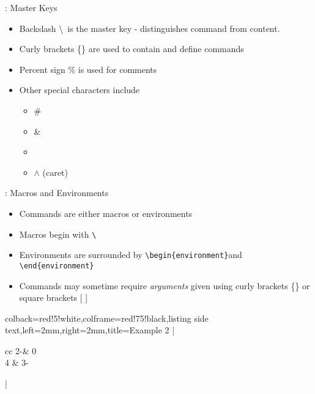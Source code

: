 \documentclass{beamer}
\begin{document}
\begin{frame}[fragile]{\insertsection : Master Keys}
    \begin{itemize}
        \item Backslash \textbackslash \, is the master key - distinguishes command from content.
        \item Curly brackets \{\} are used to contain and define commands
        \item Percent sign \% is used for comments
        \item Other special characters include
        \begin{itemize}
            \item \#
            \item \&
            \item \underline{\hspace{0.8em}}        %
            \item $\wedge$ (caret)
        \end{itemize}
    \end{itemize}
\end{frame}
\begin{frame}[fragile]{\insertsection : Macros and Environments}
    \begin{itemize}
        \item Commands are either macros or environments
        \item Macros begin with \verb|\|
        \item Environments are surrounded by \verb|\begin{environment}|and \verb|\end{environment}|
        \item Commands may sometime require \emph{arguments} given using curly brackets \{\} or square brackets [ ]
    \end{itemize}
    \begin{tcblisting}{colback=red!5!white,colframe=red!75!black,listing side text,left=2mm,right=2mm,title=Example 2}
\left|
\begin{array}{cc}
     2-\lambda & 0\\
     4 & 3-\lambda\\
\end{array}
\right|
    \end{tcblisting}
\end{frame}
\end{document}
